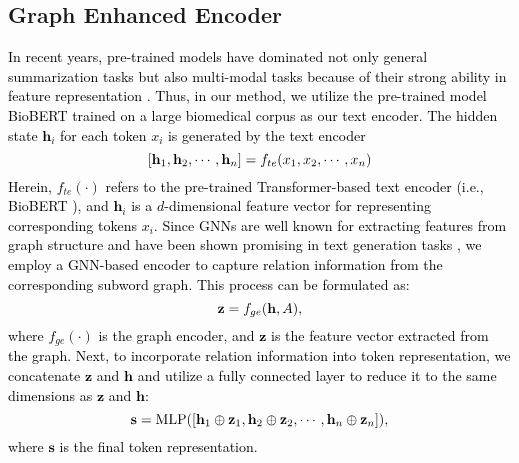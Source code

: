 \documentclass[11pt]{article}
\begin{document}
\subsection{Graph Enhanced Encoder}
\textcolor{black}{
%
In recent years, pre-trained models have dominated not only general summarization tasks but also multi-modal tasks because of their strong ability in feature representation \cite{wu-2021-bass,zhang2020pegasus, yuan2021instancerefer, yuan2022x}.
%
Thus, in our method, we utilize the pre-trained model BioBERT \cite{BioBERT} trained on a large biomedical corpus as our text encoder.
%
The hidden state $\mathbf{h}_{i}$ for each token $x_{i}$ is generated by the text encoder
%
\begin{equation}
\setlength\abovedisplayskip{5pt}
\setlength\belowdisplayskip{5pt}
    [\mathbf{h}_{1},\mathbf{h}_{2},\cdots,\mathbf{h}_{n}] = {f}_{te}(x_1,x_2,\cdots ,x_n)
\end{equation}
%
Herein, ${f}_{te}(\cdot)$ refers to the pre-trained Transformer-based text encoder (i.e., BioBERT \cite{BioBERT}), and $\mathbf{h}_{i}$ is a $d$-dimensional feature vector for representing corresponding tokens $x_{i}$.
%
Since GNNs are well known for extracting features from graph structure and have been shown promising in text generation tasks \cite{jia2020neural,hu2021word}, we employ a GNN-based encoder to capture relation information from the corresponding subword graph.
%
This process can be formulated as:
\begin{equation}
\setlength\abovedisplayskip{6pt}
\setlength\belowdisplayskip{6pt}
    \mathbf{z} = f_{ge}(\mathbf{h},A),
    \label{eq:graph-encoder}
\end{equation}
where $f_{ge}(\cdot)$ is the graph encoder, and $\mathbf{z}$ is the feature vector extracted from the graph.
%
Next, to incorporate relation information into token representation, we concatenate $\mathbf{z}$ and $\mathbf{h}$ and utilize a fully connected layer to reduce it to the same dimensions as $\mathbf{z}$ and $\mathbf{h}$:
%
\begin{equation}
\setlength\abovedisplayskip{6pt}
\setlength\belowdisplayskip{6pt}
    \mathbf{s} = \text{MLP}([\mathbf{h}_{1}\oplus\mathbf{z}_{1},\mathbf{h}_{2}\oplus\mathbf{z}_{2},\cdots,\mathbf{h}_{n}\oplus\mathbf{z}_{n}]),
    \label{eq:graph-encoder}
\end{equation}
where $\mathbf{s}$ is the final token representation.
}
%
\end{document}
